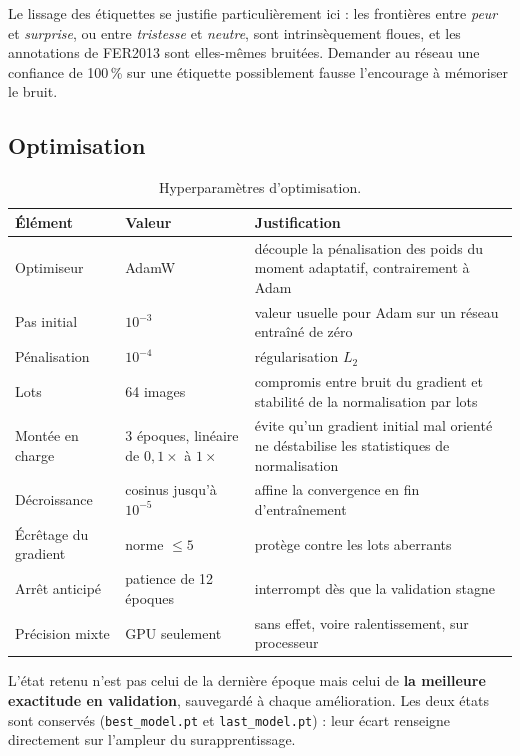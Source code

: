 \documentclass[11pt,a4paper]{article}
\newcommand{\code}[1]{\texttt{\small #1}}
\begin{document}
Le lissage des étiquettes se justifie particulièrement ici : les frontières
entre \emph{peur} et \emph{surprise}, ou entre \emph{tristesse} et
\emph{neutre}, sont intrinsèquement floues, et les annotations de FER2013 sont
elles-mêmes bruitées. Demander au réseau une confiance de 100\,\% sur une
étiquette possiblement fausse l'encourage à mémoriser le bruit.

\subsection{Optimisation}

\begin{table}[h]
\centering
\small
\begin{tabularx}{\textwidth}{llX}
\toprule
\textbf{Élément} & \textbf{Valeur} & \textbf{Justification} \\
\midrule
Optimiseur & AdamW & découple la pénalisation des poids du moment adaptatif, contrairement à Adam \\
Pas initial & $10^{-3}$ & valeur usuelle pour Adam sur un réseau entraîné de zéro \\
Pénalisation & $10^{-4}$ & régularisation $L_2$ \\
Lots & 64 images & compromis entre bruit du gradient et stabilité de la normalisation par lots \\
Montée en charge & 3 époques, linéaire de $0{,}1\times$ à $1\times$ & évite qu'un gradient initial mal orienté ne déstabilise les statistiques de normalisation \\
Décroissance & cosinus jusqu'à $10^{-5}$ & affine la convergence en fin d'entraînement \\
Écrêtage du gradient & norme $\le 5$ & protège contre les lots aberrants \\
Arrêt anticipé & patience de 12 époques & interrompt dès que la validation stagne \\
Précision mixte & GPU seulement & sans effet, voire ralentissement, sur processeur \\
\bottomrule
\end{tabularx}
\caption{Hyperparamètres d'optimisation.}
\end{table}

L'état retenu n'est pas celui de la dernière époque mais celui de \textbf{la
meilleure exactitude en validation}, sauvegardé à chaque amélioration. Les deux
états sont conservés (\code{best\_model.pt} et \code{last\_model.pt}) : leur
écart renseigne directement sur l'ampleur du surapprentissage.
\end{document}
